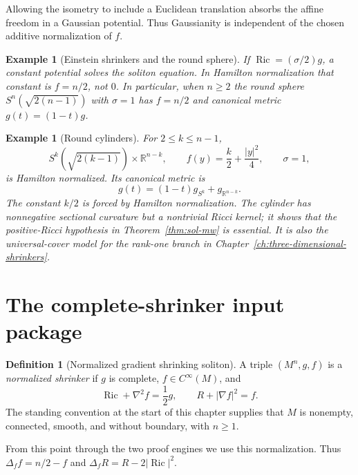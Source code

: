 \documentclass[10pt]{coll-l}
\newtheorem{example}[theorem]{Example}
\theoremstyle{definition}
\newtheorem{definition}[theorem]{Definition}
\theoremstyle{remark}
\numberwithin{section}{chapter}
\numberwithin{equation}{chapter}
\newcommand{\Ric}{\operatorname{Ric}}
\begin{document}
Allowing the isometry to include a Euclidean translation absorbs the affine
freedom in a Gaussian potential.  Thus Gaussianity is independent of the
chosen additive normalization of $f$.

\begin{example}[Einstein shrinkers and the round sphere]
If $\Ric=(\sigma/2)g$, a constant potential solves the soliton equation.
In Hamilton normalization that constant is $f=n/2$, not $0$.  In
particular, when $n\geq2$ the round sphere
$S^n(\sqrt{2(n-1)})$ with $\sigma=1$ has $f=n/2$ and canonical metric
$g(t)=(1-t)g$.
\end{example}

\begin{example}[Round cylinders]
For $2\leq k\leq n-1$,
\[
 S^k(\sqrt{2(k-1)})\times\mathbb R^{n-k},\qquad
 f(y)=\frac{k}{2}+\frac{|y|^2}{4},\qquad \sigma=1,
\]
is Hamilton normalized.  Its canonical metric is
\[
       g(t)=(1-t)g_{S^k}+g_{\mathbb R^{n-k}}.
\]
The constant $k/2$ is forced by Hamilton normalization.  The cylinder has
nonnegative sectional curvature but a nontrivial Ricci kernel; it shows
that the positive-Ricci hypothesis in Theorem~\ref{thm:sol-mw} is essential.
It is also the universal-cover model for the rank-one branch in
Chapter~\ref{ch:three-dimensional-shrinkers}.
\end{example}

\section{The complete-shrinker input package}
\label{sec:sol-shrinker-inputs}

\begin{definition}[Normalized gradient shrinking soliton]
\label{def:sol-normalized-shrinker}
A triple $(M^n,g,f)$ is a \emph{normalized shrinker} if $g$ is complete,
$f\in C^\infty(M)$, and
\begin{equation}
             \Ric+\nabla^2f=\frac12g,\qquad
             R+|\nabla f|^2=f.                           \label{eq:sol-normalized-shrinker}
\end{equation}
The standing convention at the start of this chapter supplies that $M$ is
nonempty, connected, smooth, and without boundary, with $n\geq1$.
\end{definition}

From this point through the two proof engines we use this normalization.
Thus $\Delta_ff=n/2-f$ and $\Delta_fR=R-2|\Ric|^2$.
\end{document}
